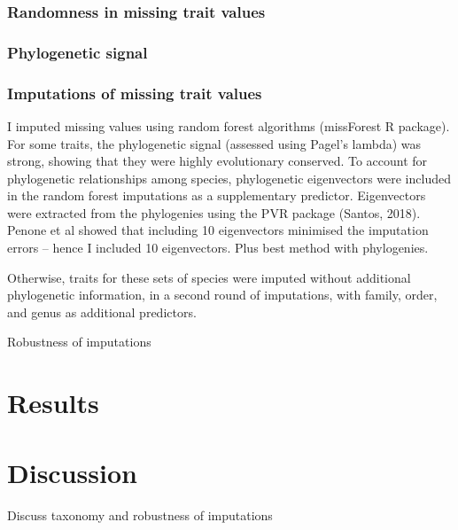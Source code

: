 \subsubsection{Randomness in missing trait values}

\subsubsection{Phylogenetic signal}

\subsubsection{Imputations of missing trait values}

I imputed missing values using random forest algorithms (missForest R package). For some traits, the phylogenetic signal (assessed using Pagel’s lambda) was strong, showing that they were highly evolutionary conserved. To account for phylogenetic relationships among species, phylogenetic eigenvectors were included in the random forest imputations as a supplementary predictor. Eigenvectors were extracted from the phylogenies using the PVR package (Santos, 2018). Penone et al showed that including 10 eigenvectors minimised the imputation errors – hence I included 10 eigenvectors. Plus best method with phylogenies.

Otherwise, traits for these sets of species were imputed without additional phylogenetic information, in a second round of imputations, with family, order, and genus as additional predictors.

Robustness of imputations

\section{Results}


\section{Discussion}
Discuss taxonomy and robustness of imputations

